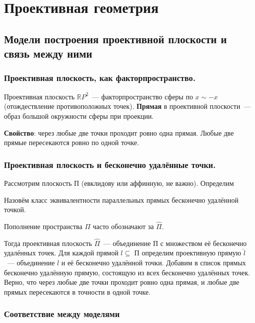 \documentclass[11pt]{article}
\begin{document}
    \section{Проективная геометрия}
    \subsection{Модели построения проективной плоскости и связь между ними}
    \subsubsection*{Проективная плоскость, как факторпространство.}
    \begin{definition}
        Проективная плоскость $\mathbb{R}P^2$~--- факторпространство сферы по $x \sim -x$ (отождествление противоположных точек). \textbf{Прямая} в проективной плоскости~--- образ большой окружности сферы при проекции.
    \end{definition}

    \textbf{Свойство}: через любые две точки проходит ровно одна прямая. Любые две прямые пересекаются ровно по одной точке.

    \subsubsection*{Проективная плоскость и бесконечно удалённые точки.}

    Рассмотрим плоскость П (евклидову или аффинную, не важно). Определим
    \begin{definition}
        Назовём класс эквивалентности параллельных прямых бесконечно удалённой точкой.
    \end{definition}
    \begin{remark}
        Пополнение пространства $\Pi$ часто обозначают за $\widehat{\Pi}$.
    \end{remark}
    Тогда проективная плоскость $\widehat{\Pi}$~--- объединение П с множеством её бесконечно удалённых точек. Для каждой прямой $l \subseteq$ П определим проективную прямую $\hat{l}$~--- объединение $l$ и её бесконечно удалённой точки. Добавим в список прямых бесконечно удалённую прямую, состоящую из всех бесконечно удалённых точек.\\
    Верно, что через любые две точки проходит ровно одна прямая, и любые две прямых пересекаются в точности в одной точке.

    \subsubsection*{Соответствие между моделями}
\end{document}
